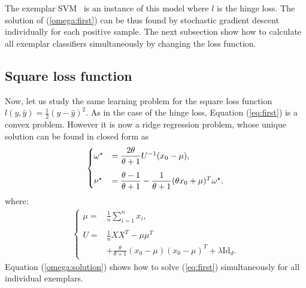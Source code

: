 The exemplar SVM~\cite{Efros11,Efros12} is an instance of this model where $l$ is the hinge loss. 
The solution of (\ref{omega:first}) can be thus found by stochastic gradient descent~\cite{bottou10} individually for each positive sample. The next subsection show how to calculate all exemplar classifiers simultaneously by changing the loss function.

\subsection{Square loss function}\label{slem:intro}
Now, let us study the same learning problem for the square loss function $l(y,\hat{y}) = \frac{1}{2}(y-\hat{y})^2$. As in the case of the hinge loss, Equation (\ref{eq:first}) is a convex problem. 
However it is now a ridge regression problem, whose unique solution can be found in closed form as
\begin{align}
\begin{cases}
\vspace{3 mm}
\omega^\star &= \dfrac{2\theta}{\theta+1}U^{-1}(x_0-\mu), \\
\nu^\star &= \dfrac{\theta-1}{\theta+1}-\dfrac{1}{\theta+1}(\theta x_0+\mu)^T\omega^\star,
\end{cases}
\label{omega:solution}
\end{align}
where:
\begin{align}
\begin{cases}
\mu = &\frac{1}{n}\sum_{i=1}^n x_i,\\ \\
U = &\frac{1}{n}XX^T-\mu\mu^T\\
&+\frac{\theta}{\theta+1}(x_0-\mu)(x_0-\mu)^T+\lambda\mathrm{Id}_d. \label{eq:U}
\end{cases}
\end{align}
Equation (\ref{omega:solution}) shows how to solve (\ref{eq:first}) simultaneously for all individual exemplars.
\cite{lssvm}

